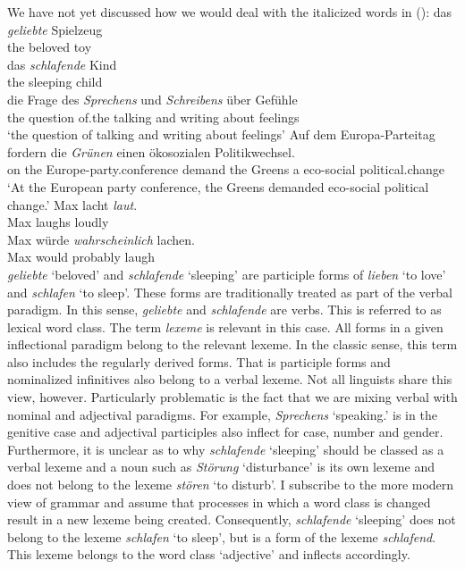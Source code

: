 \addlines
We have not yet discussed how we would deal with the italicized words in ():
\eal
\ex 
\gll das \emph{geliebte} Spielzeug\\
	 the beloved toy\\
\ex 
\gll das \emph{schlafende} Kind\\
	 the sleeping child\\
\ex 
\gll die Frage des \emph{Sprechens} und \emph{Schreibens} über Gefühle\\
	 the question of.the talking and writing about feelings\\
\glt `the question of talking and writing about feelings'
\ex 
\gll Auf dem Europa-Parteitag fordern die \emph{Grünen} einen ökosozialen Politikwechsel.\\
	 on the Europe-party.conference demand the Greens a eco-social political.change\\
\glt `At the European party conference, the Greens demanded eco-social political change.'
\ex\label{Wortart-adverbiales-Adjektiv} 
\gll Max lacht \emph{laut}.\\
	 Max laughs loudly\\
\ex\label{Wortart-Satzadverb-Adjektiv} 
\gll Max würde \emph{wahrscheinlich} lachen.\\
	 Max would probably laugh\\
\zl
\emph{geliebte} `beloved' and \emph{schlafende} `sleeping' are  participle forms of \emph{lieben} `to love' and \emph{schlafen} `to sleep'.
These forms are traditionally treated as part of the verbal paradigm. In this sense, \emph{geliebte} and \emph{schlafende} are verbs. This 
is referred to as lexical word class. The term \emph{lexeme} is relevant in this case. All forms in a given inflectional paradigm
belong to the relevant lexeme. In the classic sense, this term also includes the regularly derived forms. That is
participle forms and nominalized infinitives also belong to a verbal lexeme. Not all linguists share this view, however. Particularly problematic is
the fact that we are mixing verbal with nominal and adjectival paradigms. For example,
\emph{Sprechens} `speaking.\gen{}' is in the genitive case and adjectival
participles also inflect for case, number and gender. Furthermore, it is unclear as to why \emph{schlafende} `sleeping' should be classed as a verbal lexeme and
a noun such as \emph{Störung} `disturbance' is its own lexeme and does not belong to the lexeme \emph{stören} `to disturb'. I subscribe to the more modern view
of grammar and assume that processes in which a word class is changed result in a new lexeme being created. Consequently, \emph{schlafende} `sleeping' does not belong to the lexeme
\emph{schlafen} `to sleep', but is a form of the lexeme \emph{schlafend}. This lexeme belongs to the word class `adjective' and inflects accordingly.   


